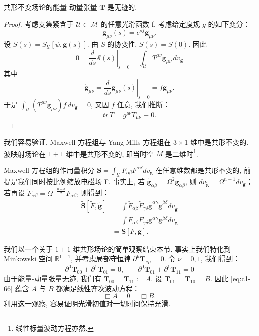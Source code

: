 \begin{proposition}\label{prop:c1-2.2}
共形不变场论的能量-动量张量 $\mathbf{T}$ 是无迹的. 
\end{proposition}

\begin{proof}
考虑支集紧含于 $\mathcal{U} \subset \mathcal{M}$ 的任意光滑函数 f. 考虑给定度规 $g$ 的如下变分：
\[
\mathbf{g}_{\mu\nu}(s) = e^{sf}\mathbf{g}_{\mu\nu}.
\]
设 $S(s) = S_{\mathcal{U}}[\psi, \mathbf{g}(s)]$. 由 $S$ 的协变性, $S(s) = S(0)$. 因此
\[
0 = \left.\frac{d}{ds}\mathcal{S}(s)\right|_{s=0} = \int_{\mathcal{U}}T^{\mu\nu}\dot{\mathbf{g}}_{\mu\nu}\, dv_{\mathbf{g}}
\]
其中
\[
\dot{\mathbf{g}}_{\mu\nu} = \left.\frac{d}{ds}\mathbf{g}_{\mu\nu}(s)\right|_{s=0} = f\mathbf{g}_{\mu\nu}.
\]
于是 $\int_{\mathcal{U}}\left(T^{\mu\nu}\mathbf{g}_{\mu\nu}\right)f\, dv_{\mathbf{g}} = 0$, 又因 $f$ 任意, 我们推断：
\[
tr\, T = g^{\mu\nu}T_{\mu\nu} \equiv 0.
\]
\end{proof}

我们容易验证, Maxwell 方程组与 Yang-Mills 方程组在 $3\times 1$ 维中是共形不变的. 波映射场论在 $1+1$ 维中是共形不变的, 即当时空 $M$ 是二维时\footnote{线性标量波动方程亦然. }. 

\begin{remark*}
Maxwell 方程组的作用量积分 $\mathbf{S} = \int_{\mathcal{U}}F_{\alpha\beta}F^{\alpha\beta}dv_{\mathbf{g}}$ 在任意维数都是共形不变的, 前提是我们同时按比例缩放电磁场 F. 事实上, 若 $\tilde{\mathbf{g}}_{\alpha\beta} = \Omega^2\mathbf{g}_{\alpha\beta}$, 则 $dv_{\tilde{\mathbf{g}}} = \Omega^{n+1}dv_{\mathbf{g}}$；若再设 $\tilde{F}_{\alpha\beta} = \Omega^{-\frac{n-3}{2}}F_{\alpha\beta}$, 则得到：
\[
\begin{aligned}
\tilde{\mathbf{S}}[\tilde{F}, \tilde{\mathbf{g}}] &= \int \tilde{F}_{\alpha\beta}\tilde{F}_{\gamma\delta}\tilde{\mathbf{g}}^{\alpha\gamma}\tilde{\mathbf{g}}^{\beta\delta}dv_{\tilde{\mathbf{g}}}\\
&= \int F_{\alpha\beta}F_{\gamma\delta}\mathbf{g}^{\alpha\gamma}\mathbf{g}^{\beta\delta}dv_{\mathbf{g}}\\
&= \mathbf{S}[F, \mathbf{g}].
\end{aligned}
\]
\end{remark*}

我们以一个关于 $1+1$ 维共形场论的简单观察结束本节. 事实上我们特化到 Minkowski 空间 $\mathbb{R}^{1+1}$, 并考虑局部守恒律 $\partial^\mu\mathbf{T}_{\nu\mu} = 0$. 令 $\nu = 0, 1$, 我们得到：
\begin{equation}
\partial^0\mathbf{T}_{00} + \partial^1\mathbf{T}_{01} = 0, \qquad \partial^0\mathbf{T}_{01} + \partial^1\mathbf{T}_{11} = 0\label{eq:c1-66}
\end{equation}
由于能量-动量张量无迹, 我们有 $\mathbf{T}_{00} = \mathbf{T}_{11} := A$. 设 $\mathbf{T}_{01} = \mathbf{T}_{10} = B$. 因此 \eqref{eq:c1-66} 蕴含 $A$ 与 $B$ 都满足线性齐次波动方程：
\begin{equation}
\Box A = 0 = \Box B.\label{eq:c1-67}
\end{equation}
利用这一观察, 容易证明光滑初值对一切时间保持光滑. 


